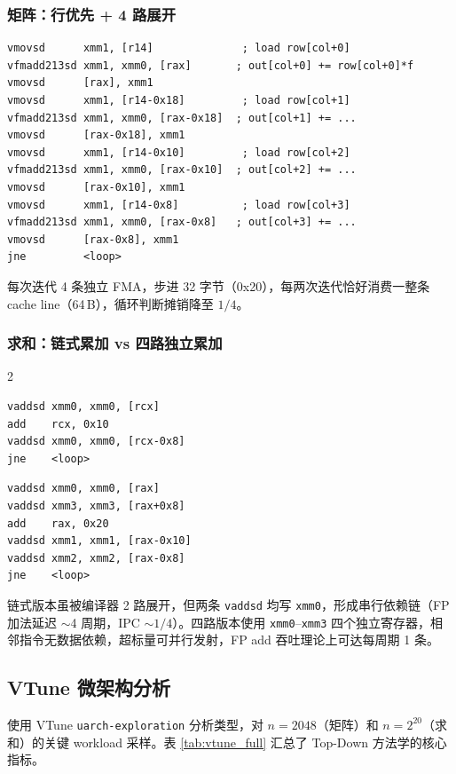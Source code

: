 \documentclass[a4paper,11pt,UTF8]{ctexart}
\begin{document}
\subsubsection{矩阵：行优先 + 4 路展开}
\begin{lstlisting}[caption=unrolled4 内循环,basicstyle=\ttfamily\tiny,numbers=none]
vmovsd      xmm1, [r14]              ; load row[col+0]
vfmadd213sd xmm1, xmm0, [rax]       ; out[col+0] += row[col+0]*f
vmovsd      [rax], xmm1
vmovsd      xmm1, [r14-0x18]         ; load row[col+1]
vfmadd213sd xmm1, xmm0, [rax-0x18]  ; out[col+1] += ...
vmovsd      [rax-0x18], xmm1
vmovsd      xmm1, [r14-0x10]         ; load row[col+2]
vfmadd213sd xmm1, xmm0, [rax-0x10]  ; out[col+2] += ...
vmovsd      [rax-0x10], xmm1
vmovsd      xmm1, [r14-0x8]          ; load row[col+3]
vfmadd213sd xmm1, xmm0, [rax-0x8]   ; out[col+3] += ...
vmovsd      [rax-0x8], xmm1
jne         <loop>
\end{lstlisting}

每次迭代 4 条独立 FMA，步进 32 字节（0x20），每两次迭代恰好消费一整条 cache line（64\,B），循环判断摊销降至 $1/4$。

\subsubsection{求和：链式累加 vs 四路独立累加}

\begin{multicols}{2}
\begin{lstlisting}[caption=链式累加（单依赖链）,basicstyle=\ttfamily\tiny,numbers=none]
vaddsd xmm0, xmm0, [rcx]
add    rcx, 0x10
vaddsd xmm0, xmm0, [rcx-0x8]
jne    <loop>
\end{lstlisting}
\columnbreak
\begin{lstlisting}[caption=四路独立累加,basicstyle=\ttfamily\tiny,numbers=none]
vaddsd xmm0, xmm0, [rax]
vaddsd xmm3, xmm3, [rax+0x8]
add    rax, 0x20
vaddsd xmm1, xmm1, [rax-0x10]
vaddsd xmm2, xmm2, [rax-0x8]
jne    <loop>
\end{lstlisting}
\end{multicols}

链式版本虽被编译器 2 路展开，但两条 \texttt{vaddsd} 均写 \texttt{xmm0}，形成串行依赖链（FP 加法延迟 $\sim$4 周期，IPC $\sim 1/4$）。四路版本使用 \texttt{xmm0}--\texttt{xmm3} 四个独立寄存器，相邻指令无数据依赖，超标量可并行发射，FP add 吞吐理论上可达每周期 1 条。

\subsection{VTune 微架构分析}
使用 VTune \texttt{uarch-exploration} 分析类型，对 $n=2048$（矩阵）和 $n=2^{20}$（求和）的关键 workload 采样。表 \ref{tab:vtune_full} 汇总了 Top-Down 方法学的核心指标。
\end{document}
